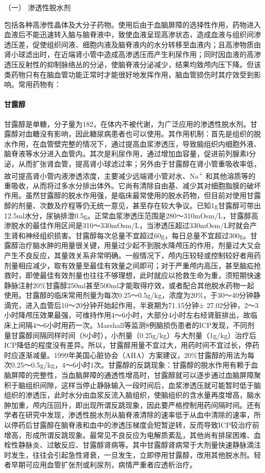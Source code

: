 \hypertarget{text00107.htmlux5cux23CHP4-6-3-3-1}{}
（一） 渗透性脱水剂

包括各种高渗性晶体及大分子药物。使用后由于血脑屏障的选择性作用，药物进入血液后不能迅速转入脑与脑脊液中，致使血液呈现高渗状态，造成血液与组织间渗透压差，促使组织间液、细胞内液及脑脊液内的水分转移至血液内；且高渗物质由肾小球滤出时，在近端肾小管中造成高渗透压而产生利尿作用；同时因血液的高渗透压反射性的抑制脉络丛的分泌，使脑脊液分泌减少，结果均致颅内压下降。但该类药物只有在脑血管功能正常时才能很好地发挥作用，脑血管损伤时其疗效受到影响。常用药物有：

\paragraph{甘露醇}

甘露醇是单糖，分子量为182，在体内不被代谢，为广泛应用的渗透性脱水剂。甘露醇对血糖没有影响，因此糖尿病患者也可以使用。其作用机制：首先是组织的脱水作用，在血管壁完整的情况下，通过提高血浆渗透压，导致脑组织内细胞外液、脑脊液等水分进入血管内。其次是利尿作用，通过增加血容量，促进前列腺素Ⅰ分泌，从而扩张肾血管，提高肾小球滤过率；另外由于甘露醇在肾小管重吸收率低，故可提高肾小管内液渗透浓度，主要减少远端肾小管对水、Na\textsuperscript{+}
和其他溶质等的重吸收，从而将过多水分排出体外。它尚有清除自由基、减少其对细胞脂膜的破坏作用。虽然甘露醇的脱水作用强，是临床最常使用的脱水药物，但目前对使用甘露醇的剂量、次数及疗程等仍无统一意见，甚至存在较大争议。已知1g甘露醇可带出12.5ml水分，尿钠排泄0.5g。正常血浆渗透压范围是280～310mOsm/L，甘露醇高渗脱水的最佳作用区间是310～330mOsm/L，当渗透压超过330mOsm/L时就会产生肾和神经组织损害。甘露醇每次总量不宜超过60g，每日总量不宜超过300g。甘露醇治疗脑水肿的用量很关键，用量过少起不到脱水降颅压的作用，剂量过大又会产生不良反应，其量效关系非常明确。一般情况下，颅内压较轻或控制较好者用药剂量相应减少，取有效量至最佳有效量之间即可；对于严重颅内高压，甚至脑疝抢救时，即使最佳有效剂量也往往不够理想，此时就应以抢救生命为重，须短期快速静脉注射20\%甘露醇250ml甚至500ml才能取得疗效，或者配合其他脱水药物一起使用。甘露醇的临床常用剂量为每次0.25～0.5g/kg，浓度为20\%，于30～40分钟静滴完，进入血管后10～20分钟开始起作用，半衰期为71.15分钟±
27.02分钟，2～3小时降颅压效果最强，可维持作用4～6小时，大部分4小时左右经肾脏排出，故临床上间隔4～6小时用药一次。Marshall等监测8例脑损伤患者的ICP发现，不同剂量甘露醇间隔同样时间（8小时），小剂量（0.25g/kg）与大剂量（1g/kg）治疗后ICP降低的程度没有差异。所以，甘露醇用量不宜过大，用药时间不宜过长，停药时应逐渐减量。1999年美国心脏协会（AHA）方案建议，20\%甘露醇的用法为每次0.25～0.5g/kg，4～6小时1次。甘露醇的反跳现象：甘露醇的脱水作用有赖于血脑屏障的完整性，当血脑屏障的通透性增高时，甘露醇就可以逐步通过血脑屏障聚积于脑组织间隙，这样当停止静脉输入一段时间后，血浆渗透压就可能暂时低于脑组织的渗透压，此时水分由血浆反流入脑组织，使脑组织的含水量再度增高，脑水肿加重，颅内压回升，即出现所谓反跳现象，因此要严格控制用药间隔时间。还有学者在研究中发现，渗透性脱水剂从脑脊液清除的速率低于从血中清除的速率，所以停药后甘露醇在脑脊液和血中的渗透压梯度会短暂逆转，反而导致ICP较治疗前增高，形成所谓反跳现象。最常见不良反应为电解质紊乱，其他尚有排尿困难、血栓性静脉炎、过敏反应、甘露醇肾病等。其中甘露醇肾病常于大剂量快速静脉滴注时发生，往往会引起急性肾衰，一旦发生，立即停用甘露醇，改用其他脱水剂。轻者早期可应用血管扩张剂或利尿剂，病情严重者应透析治疗。


